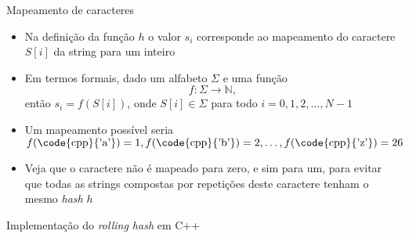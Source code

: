 \begin{frame}[fragile]{Mapeamento de caracteres}

    \begin{itemize}
        \item Na definição da função $h$ o valor $s_i$ corresponde ao mapeamento do caractere
        $S[i]$ da string para um inteiro
        \pause


        \item Em termos formais, dado um alfabeto $\Sigma$ e uma função
        \[
            f : \Sigma \to \mathbb{N},
        \]
        então $s_i = f(S[i])$, onde $S[i]\in\Sigma$ para todo $i = 0, 1, 2, \ldots, N - 1$
        \pause


        \item Um mapeamento possível seria $f(\mbox{\code{cpp}{'a'}}) = 1, f(\mbox{\code{cpp}{'b'}}) = 2, \ldots,
        f(\mbox{\code{cpp}{'z'}}) = 26$
        \pause

        \item Veja que o caractere  não é mapeado para zero, e sim para um, para
            evitar que todas as strings compostas por repetições deste caractere tenham o 
            mesmo \textit{hash} $h$
    \end{itemize}

\end{frame}


\begin{frame}[fragile]{Implementação do {\it rolling hash} em C++}
\end{frame}

